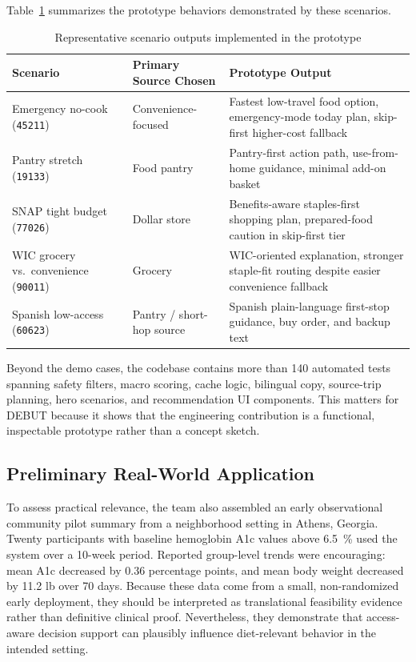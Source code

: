 \documentclass[11pt,letterpaper]{article}
\begin{document}
Table~\ref{tab:scenarios} summarizes the prototype behaviors demonstrated by these scenarios.

\begin{table}[H]
\centering
\small
\caption{Representative scenario outputs implemented in the prototype}
\label{tab:scenarios}
\begin{tabularx}{\linewidth}{>{\raggedright\arraybackslash}p{2.25cm} >{\raggedright\arraybackslash}p{2.2cm} >{\raggedright\arraybackslash}X}
\toprule
\textbf{Scenario} & \textbf{Primary Source Chosen} & \textbf{Prototype Output} \\
\midrule
Emergency no-cook (\texttt{45211}) & Convenience-focused & Fastest low-travel food option, emergency-mode today plan, skip-first higher-cost fallback \\
Pantry stretch (\texttt{19133}) & Food pantry & Pantry-first action path, use-from-home guidance, minimal add-on basket \\
SNAP tight budget (\texttt{77026}) & Dollar store & Benefits-aware staples-first shopping plan, prepared-food caution in skip-first tier \\
WIC grocery vs.\ convenience (\texttt{90011}) & Grocery & WIC-oriented explanation, stronger staple-fit routing despite easier convenience fallback \\
Spanish low-access (\texttt{60623}) & Pantry / short-hop source & Spanish plain-language first-stop guidance, buy order, and backup text \\
\bottomrule
\end{tabularx}
\end{table}

Beyond the demo cases, the codebase contains more than 140 automated tests spanning safety filters, macro scoring, cache logic, bilingual copy, source-trip planning, hero scenarios, and recommendation UI components. This matters for DEBUT because it shows that the engineering contribution is a functional, inspectable prototype rather than a concept sketch.

\subsection{Preliminary Real-World Application}
To assess practical relevance, the team also assembled an early observational community pilot summary from a neighborhood setting in Athens, Georgia.\cite{accessplate_pilot_2026} Twenty participants with baseline hemoglobin A1c values above \SI{6.5}{\percent} used the system over a 10-week period. Reported group-level trends were encouraging: mean A1c decreased by \num{0.36} percentage points, and mean body weight decreased by \num{11.2} lb over 70 days. Because these data come from a small, non-randomized early deployment, they should be interpreted as translational feasibility evidence rather than definitive clinical proof. Nevertheless, they demonstrate that access-aware decision support can plausibly influence diet-relevant behavior in the intended setting.
\end{document}
